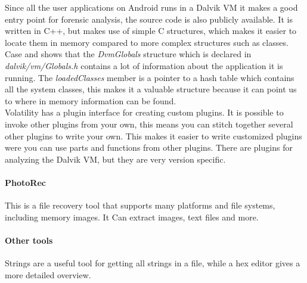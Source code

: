   Since all the user applications on Android runs in a Dalvik VM it makes a good entry
  point for forensic analysis, the source code is also publicly available. It is
  written in C++, but makes use of simple C structures, which makes it easier to
  locate them in memory compared to more complex structures such as classes. Case
  and \cite{holger} shows that the \textit{DvmGlobals} structure which is
  declared in \textit{dalvik/vm/Globals.h} contains a lot of information about
  the application it is running. The \textit{loadedClasses} member is a pointer
  to a hash table which contains all the system classes, this makes it a
  valuable structure because it can point us to where in memory information can
  be found.\\

  Volatility has a plugin interface for creating custom plugins. It is possible to
  invoke other plugins from your own, this means you can stitch together
  several other plugins to write your own. This makes it easier to write customized plugins were 
  you can use parts and functions from other plugins.
  There are plugins for analyzing the Dalvik VM, but they are very version specific.

  \paragraph{PhotoRec} This is a file recovery tool that supports many platforms and file systems, including memory images. 
  It Can extract images, text files and more. %

  \paragraph{Other tools} Strings are a useful tool for getting all strings in a file, while a hex editor gives a more detailed overview.
